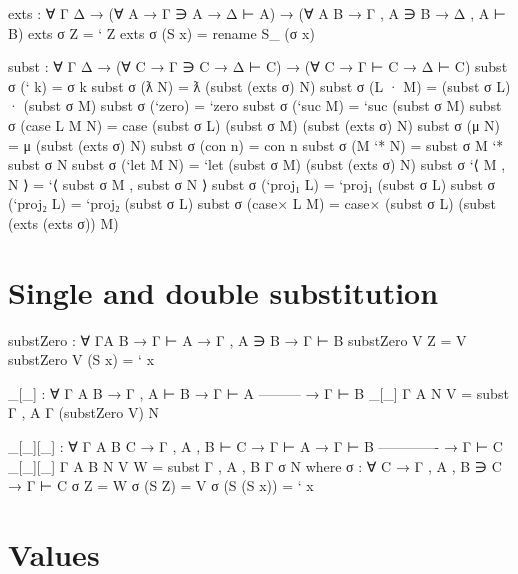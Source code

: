 \begin{fence}
\begin{code}
exts : ∀ {Γ Δ} → (∀ {A} → Γ ∋ A → Δ ⊢ A) → (∀ {A B} → Γ , A ∋ B → Δ , A ⊢ B)
exts σ Z      =  ` Z
exts σ (S x)  =  rename S_ (σ x)

subst : ∀ {Γ Δ} → (∀ {C} → Γ ∋ C → Δ ⊢ C) → (∀ {C} → Γ ⊢ C → Δ ⊢ C)
subst σ (` k)          =  σ k
subst σ (ƛ N)          =  ƛ (subst (exts σ) N)
subst σ (L · M)        =  (subst σ L) · (subst σ M)
subst σ (`zero)        =  `zero
subst σ (`suc M)       =  `suc (subst σ M)
subst σ (case L M N)   =  case (subst σ L) (subst σ M) (subst (exts σ) N)
subst σ (μ N)          =  μ (subst (exts σ) N)
subst σ (con n)        =  con n
subst σ (M `* N)       =  subst σ M `* subst σ N
subst σ (`let M N)     =  `let (subst σ M) (subst (exts σ) N)
subst σ `⟨ M , N ⟩     =  `⟨ subst σ M , subst σ N ⟩
subst σ (`proj₁ L)     =  `proj₁ (subst σ L)
subst σ (`proj₂ L)     =  `proj₂ (subst σ L)
subst σ (case× L M)    =  case× (subst σ L) (subst (exts (exts σ)) M)
\end{code}
\end{fence}

\hypertarget{single-and-double-substitution}{%
\section{Single and double
substitution}\label{single-and-double-substitution}}

\begin{fence}
\begin{code}
substZero : ∀ {Γ}{A B} → Γ ⊢ A → Γ , A ∋ B → Γ ⊢ B
substZero V Z      =  V
substZero V (S x)  =  ` x

_[_] : ∀ {Γ A B}
  → Γ , A ⊢ B
  → Γ ⊢ A
    ---------
  → Γ ⊢ B
_[_] {Γ} {A} N V =  subst {Γ , A} {Γ} (substZero V) N

_[_][_] : ∀ {Γ A B C}
  → Γ , A , B ⊢ C
  → Γ ⊢ A
  → Γ ⊢ B
    -------------
  → Γ ⊢ C
_[_][_] {Γ} {A} {B} N V W =  subst {Γ , A , B} {Γ} σ N
  where
  σ : ∀ {C} → Γ , A , B ∋ C → Γ ⊢ C
  σ Z          =  W
  σ (S Z)      =  V
  σ (S (S x))  =  ` x
\end{code}
\end{fence}

\hypertarget{values}{%
\section{Values}\label{values}}

